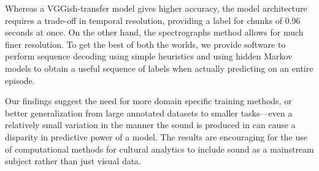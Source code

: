 \documentclass[12pt]{article}
\begin{document}
Whereas a VGGish-transfer model gives higher accuracy, the model architecture requires a
trade-off in temporal resolution, providing a label for chunks of 0.96 seconds at once. On the
other hand, the spectrographs method allows for much finer resolution. To get the best of both
the worlds, we provide software to perform sequence decoding using simple heuristics and using
hidden Markov models to obtain a useful sequence of labels when actually predicting on an entire
episode.

Our findings suggest the need for more domain specific training methods, or better generalization
from large annotated datasets to smaller tasks---even a
relatively small variation in the manner the sound is produced in can cause a disparity in 
predictive power of a model.
The results are encouraging for the use of computational methods for cultural analytics to include
sound as a mainstream subject rather than just visual data.

\vspace{-.5em}
\renewcommand\refname{\small References}
{
    \footnotesize
    
}
\end{document}
